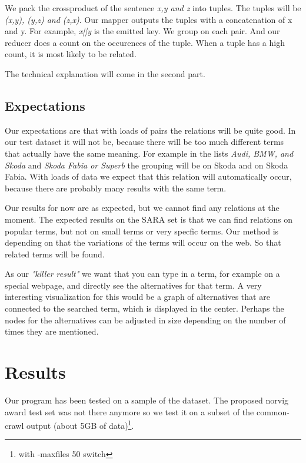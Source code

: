 \documentclass[a4paper,10pt]{article}
\begin{document}
We pack the crossproduct of the sentence \emph{x,y and z} into tuples. The tuples will be \emph{(x,y), (y,z) and (z,x)}. Our mapper outputs the tuples with a concatenation of x and y. For example, \emph{x||y} is the emitted key. We group on each pair. And our reducer does a count on the occurences of the tuple. When a tuple has a high count, it is most likely to be related. 

The technical explanation will come in the second part. 


\subsection{Expectations}
Our expectations are that with loads of pairs the relations will be quite good. In our test dataset it will not be, because there will be too much different terms that actually have the same meaning. For example in the lists \emph{Audi, BMW, and Skoda} and \emph{Skoda Fabia or Superb} the grouping will be on Skoda and on Skoda Fabia. With loads of data we expect that this relation will automatically occur, because there are probably many results with the same term.

Our results for now are as expected, but we cannot find any relations at the moment. The expected results on the SARA set is that we can find relations on popular terms, but not on small terms or very specfic terms. Our method is depending on that the variations of the terms will occur on the web. So that related terms will be found.

As our \emph{"killer result"} we want that you can type in a term, for example on a special webpage, and directly see the alternatives for that term. A very interesting visualization for this would be a graph of alternatives that are connected to the searched term, which is displayed in the center. Perhaps the nodes for the alternatives can be adjusted in size depending on the number of times they are mentioned.

\section{Results}
Our program has been tested on a sample of the dataset. The proposed norvig award test set was not there anymore so we test it on a subset of the common-crawl output (about 5GB of data)\footnote{with -maxfiles 50 switch}.
\end{document}
